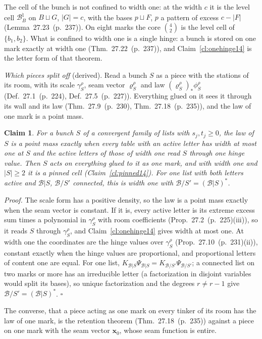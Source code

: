 \documentclass[11pt]{article}
\newcommand{\cB}{\mathcal B}
\newcommand{\hb}[2]{#1~(p.~#2)}   %
\theoremstyle{plain}
\newtheorem{claim}{Claim}[section]
\theoremstyle{remark}
\begin{document}
The cell of the bunch is not confined to width one: at the width $c$ it is the level cell $\cB^\natural_B$ on $B\sqcup G$, $|G|=c$, with the bases $p\sqcup F$, $p$ a pattern of excess $c-|F|$ (Lemma~\hb{27.23}{237}). On eight marks the core $\binom42$ is the level cell of $\{b_1,b_2\}$. What is confined to width one is a single hinge: a bunch is stored on one mark exactly at width one (Thm.~\hb{27.22}{237}), and Claim~\ref{cl:onehinge14} is the letter form of that theorem.

\emph{Which pieces split off} (derived). Read a bunch $S$ as a piece with the stations of its room, with its scale $\gamma^\rho_S$, seam vector $\boldsymbol\varrho^\rho_S$ and law $(\boldsymbol\varrho^\rho_S)_\ast\phi^\rho_S$ (Def.~\hb{27.1}{224}, Def.~\hb{27.5}{227}). Everything glued on it sees it through its wall and its law (Thm.~\hb{27.9}{230}, Thm.~\hb{27.18}{235}), and the law of one mark is a point mass.

\begin{claim}\label{cl:reach14}
For a bunch $S$ of a convergent family of lists with $s_j,t_j\ge0$, the law of $S$ is a point mass exactly when every table with an active letter has width at most one at $S$ and the active letters of those of width one read $S$ through one hinge value. Then $S$ acts on everything glued to it as one mark, and with width one and $|S|\ge2$ it is a pinned cell (Claim~\ref{cl:pinned14}). For one list with both letters active and $\cB|S$, $\cB/S'$ connected, this is width one with $\cB/S'=(\cB|S)^\ast$.
\end{claim}

\emph{Proof.} The scale form has a positive density, so the law is a point mass exactly when the seam vector is constant. If it is, every active letter is its extreme excess sum times a polynomial in $\gamma^\rho_S$ with room coefficients (Prop.~\hb{27.2}{225}(iii)), so it reads $S$ through $\gamma^\rho_S$, and Claim~\ref{cl:onehinge14} gives width at most one. At width one the coordinates are the hinge values over $\gamma^\rho_S$ (Prop.~\hb{27.10}{231}(ii)), constant exactly when the hinge values are proportional, and proportional letters of content one are equal. For one list, $K_{\cB|S}\Psi_{\cB|S}=K_{\cB/S'}\Psi_{\cB/S'}$; a connected list on two marks or more has an irreducible letter (a factorization in disjoint variables would split its bases), so unique factorization and the degrees $r\neq r-1$ give $\cB/S'=(\cB|S)^\ast$. $\square$

The converse, that a piece acting as one mark on every tinker of its room has the law of one mark, is the retention theorem (Thm.~\hb{27.18}{235}) against a piece on one mark with the seam vector $\mathbf x_0$, whose seam function is entire.
\end{document}

